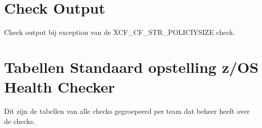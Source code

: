 \section{Check Output}
\label{sec:Check Output}

Check output bij exception van de XCF\_CF\_STR\_POLICIYSIZE check.



\section{Tabellen Standaard opstelling z/OS Health Checker}
\label{sec/Tabellen Standaard opstelling z/OS Health Checker}

Dit zijn de tabellen van alle checks gegroepeerd per team dat beheer heeft over de checks.

